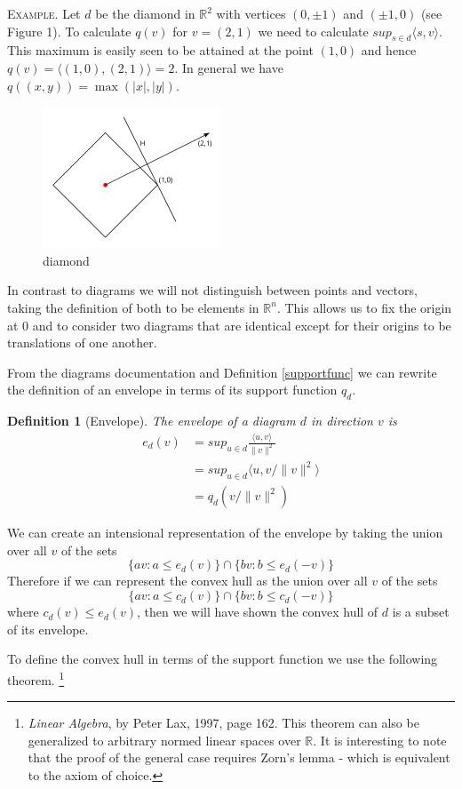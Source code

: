 \documentclass[11pt]{amsart}
\newtheorem{defn}{Definition}
\begin{document}
\textsc{Example}. Let $d$ be the diamond in $\mathbb{R}^2$ with vertices $(0, \pm1)$ and $(\pm 1, 0)$ (see Figure 1). To calculate $q(v)$ for $v = (2,1)$ 
we need to calculate $sup_{s \in d} \langle s, v \rangle$. This maximum is easily seen to be attained at the point $(1,0)$ and hence $q(v) = \langle (1,0),(2,1) \rangle = 2$. In
general we have $q((x,y)) = \max(|x|,|y|)$.

\begin{figure}[h]
\label{diamond}
\centering
\includegraphics[width=150pt]{diamond.png}
\caption{diamond}
\end{figure}

In contrast to diagrams we will not distinguish between points and vectors, taking the definition of both to be elements in $\mathbb{R}^n$.
This allows us to fix the origin at $0$ and to consider two diagrams that are identical except for their origins to be translations of one another.

From the diagrams documentation and Definition \ref{supportfunc} we can rewrite the definition of an envelope 
in terms of its support function $q_d$.
\begin{defn}[Envelope]
The envelope of a diagram $d$ in direction $v$ is
\begin{align}
e_d(v) &= sup_{u \in d} \frac{\langle u, v \rangle}{\|v\|^2}\\
           &=sup_{u \in d} \langle u, v/\|v\|^2 \rangle\\
           &=q_d(v/\|v\|^2)
\end{align}
\end{defn}

We can create an intensional representation of the envelope by taking the union over all $v$ of the sets
$$\{av : a \leq e_d(v)\} \cap \{ bv : b \leq e_d(-v)\}$$
Therefore if we can represent the convex hull as the union over all $v$ of the sets
$$\{av : a \leq c_d(v)\} \cap \{ bv : b \leq c_d(-v)\}$$
where $c_d(v) \leq e_d(v)$, then we will have shown the convex hull of $d$ is a subset of its envelope.

To define the convex hull in terms of the support function we use the following theorem. 
\footnote{\emph{Linear Algebra}, by Peter Lax, 1997, page 162. This theorem can also be generalized to
arbitrary normed linear spaces over $\mathbb{R}$. It is interesting to note that the proof of the general case requires
Zorn's lemma - which is equivalent to the axiom of choice.}
\end{document}
